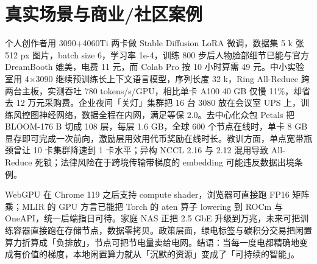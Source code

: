 \chapter{真实场景与商业/社区案例}
个人创作者用 3090+4060Ti 两卡做 Stable Diffusion LoRA 微调，数据集 5 k 张 512 px 图片，batch size 6，学习率 1e-4，训练 800 步后人物脸部细节已能与官方 DreamBooth 媲美，电费 11 元，而 Colab Pro 按 10 小时算需 49 元。中小实验室用 4×3090 继续预训练长上下文语言模型，序列长度 32 k，Ring All-Reduce 跨两台主板，实测吞吐 780 tokens/s/GPU，相比单卡 A100 40 GB 仅慢 11\%{}，却省去 12 万元采购费。企业夜间「关灯」集群把 16 台 3080 放在会议室 UPS 上，训练风控图神经网络，数据全程在内网，满足等保 2.0。去中心化众包 Petals 把 BLOOM-176 B 切成 108 层，每层 1.6 GB，全球 600 个节点在线时，单卡 8 GB 显存即可完成一次前向，激励层用效用代币奖励在线时长。教训方面，单点宽带瓶颈曾让 10 卡集群降速到 1 卡水平；异构 NCCL 2.16 与 2.12 混用导致 All-Reduce 死锁；法律风险在于跨境传输带梯度的 embedding 可能违反数据出境条例。\par
WebGPU 在 Chrome 119 之后支持 compute shader，浏览器可直接跑 FP16 矩阵乘；MLIR 的 GPU 方言已能把 Torch 的 aten 算子 lowering 到 ROCm 与 OneAPI，统一后端指日可待。家庭 NAS 正把 2.5 GbE 升级到万兆，未来可把训练容器直接跑在存储节点，数据零拷贝。政策层面，绿电标签与碳积分交易把闲置算力折算成「负排放」，节点可把节电量卖给电网。结语：当每一度电都精确地变成有价值的梯度，本地闲置算力就从「沉默的资源」变成了「可持续的智能」。\par
